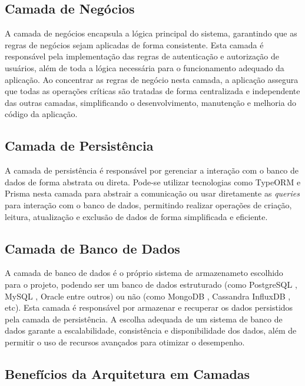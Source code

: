 \subsection{Camada de Negócios}

A camada de negócios encapsula a lógica principal do sistema, garantindo que as regras de negócios sejam aplicadas de forma consistente. Esta camada é responsável pela implementação das regras de autenticação e autorização de usuários, além de toda a lógica necessária para o funcionamento adequado da aplicação. Ao concentrar as regras de negócio nesta camada, a aplicação assegura que todas as operações críticas são tratadas de forma centralizada e independente das outras camadas, simplificando o desenvolvimento, manutenção e melhoria do código da aplicação.

\subsection{Camada de Persistência}

A camada de persistência é responsável por gerenciar a interação com o banco de dados de forma abstrata ou direta. Pode-se utilizar tecnologias como TypeORM \cite{TYPEORM} e Prisma \cite{PRISMA} nesta camada para abstrair a comunicação ou usar diretamente as \textit{queries} para interação com o banco de dados, permitindo realizar operações de criação, leitura, atualização e exclusão de dados de forma simplificada e eficiente.

\subsection{Camada de Banco de Dados}\label{subsec:camada_banco_de_dados}

A camada de banco de dados é o próprio sistema de armazenameto escolhido para o projeto, podendo ser um banco de dados estruturado (como PostgreSQL \cite{PostgreSQL}, MySQL \cite{MySQL}, Oracle \cite{Oracle} entre outros) ou não (como MongoDB \cite{MongoDB}, Cassandra \cite{Cassandra} InfluxDB \cite{InfluxDB}, etc). Esta camada é responsável por armazenar e recuperar os dados persistidos pela camada de persistência. A escolha adequada de um sistema de banco de dados garante a escalabilidade, consistência e disponibilidade dos dados, além de permitir o uso de recursos avançados para otimizar o desempenho.

\subsection{Benefícios da Arquitetura em Camadas}

